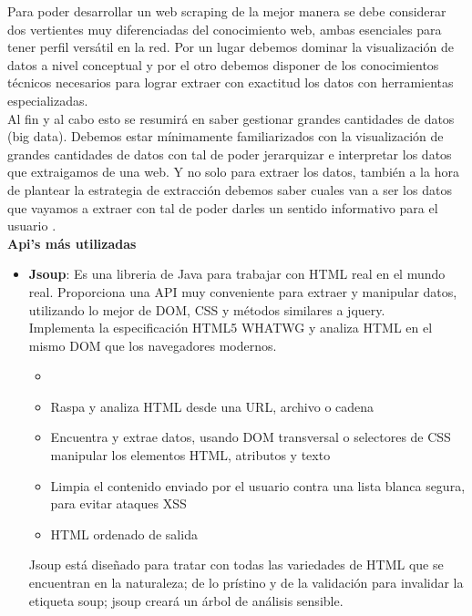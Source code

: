 \begin{itemize}
			
			Para poder desarrollar un web scraping de la mejor manera se debe considerar  dos vertientes muy diferenciadas del conocimiento web, ambas esenciales para tener perfil versátil en la red. Por un lugar debemos dominar la visualización de datos a nivel conceptual y por el otro debemos disponer de los conocimientos técnicos necesarios para lograr extraer con exactitud los datos con herramientas especializadas. \\
			Al fin y al cabo esto se resumirá en saber gestionar grandes cantidades de datos (big data). Debemos estar mínimamente familiarizados con la visualización de grandes cantidades de datos con tal de poder jerarquizar e interpretar los datos que extraigamos de una web. Y no solo para extraer los datos, también a la hora de plantear la estrategia de extracción debemos saber cuales van a ser los datos que vayamos a extraer con tal de poder darles un sentido informativo para el usuario \cite{scraping}.\\
			
			\textbf{Api's más utilizadas}
			\begin{itemize}
				\item \textbf{Jsoup}: Es una libreria de Java para trabajar con HTML real en el mundo real. Proporciona una API muy conveniente para extraer y manipular datos, utilizando lo mejor de DOM, CSS y métodos similares a jquery.\\
				
				Implementa la especificación HTML5 WHATWG y analiza HTML en el mismo DOM que los navegadores modernos.
				\begin{itemize}
					\item 
				\item Raspa y analiza HTML desde una URL, archivo o cadena
				\item Encuentra y extrae datos, usando DOM transversal o selectores de CSS
				manipular los elementos HTML, atributos y texto
				\item Limpia el contenido enviado por el usuario contra una lista blanca segura, para evitar ataques XSS
				\item HTML ordenado de salida
				\end{itemize}
				
				Jsoup está diseñado para tratar con todas las variedades de HTML que se encuentran en la naturaleza; de lo prístino y de la validación para invalidar la etiqueta soup; jsoup creará un árbol de análisis sensible.\\
				

\end{itemize}
\end{itemize}
